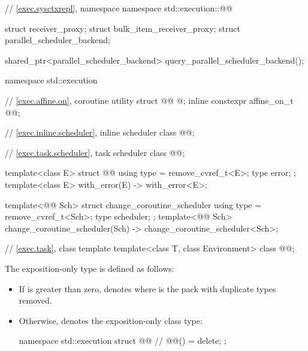 \begin{codeblock}
// \ref{exec.sysctxrepl}, namespace 
namespace std::execution::@@ {
  struct receiver_proxy;
  struct bulk_item_receiver_proxy;
  struct parallel_scheduler_backend;

  shared_ptr<parallel_scheduler_backend> query_parallel_scheduler_backend();
}

namespace std::execution {
  // \ref{exec.affine.on}, coroutine utility 
  struct @@ { @\unspec@ };
  inline constexpr affine_on_t @@{};

  // \ref{exec.inline.scheduler}, inline scheduler
  class @@;

  // \ref{exec.task.scheduler}, task scheduler
  class @@;

  template<class E>
  struct @@ {
    using type = remove_cvref_t<E>;
    type error;
  };
  template<class E>
    with_error(E) -> with_error<E>;

  template<@@ Sch>
  struct change_coroutine_scheduler {
    using type = remove_cvref_t<Sch>;
    type scheduler;
  };
  template<@@ Sch>
    change_coroutine_scheduler(Sch) -> change_coroutine_scheduler<Sch>;

  // \ref{exec.task}, class template 
  template<class T, class Environment>
    class @@;
}
\end{codeblock}

\pnum
The exposition-only type 
is defined as follows:
\begin{itemize}
\item
If  is greater than zero,
 denotes 
where  is the pack 
with duplicate types removed.
\item
Otherwise,  denotes
the exposition-only class type:
\begin{codeblock}
namespace std::execution {
  struct @@ {        // \expos
    @@() = delete;
  };
}
\end{codeblock}
\end{itemize}

